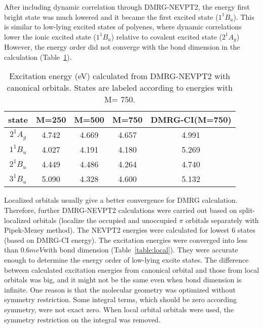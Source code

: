After including dynamic correlation through DMRG-NEVPT2, the energy first bright state was much lowered and it became the first excited state ($1^1B_u$). 
This is similar to low-lying excited states of polyenes, where dynamic correlations lower the ionic excited state ($1^1B_u$) relative to covalent excited state ($2^1A_g$)
However, the energy order did not converge with the bond dimension in the calculation (Table~\ref{table:canonical}).


\begin{table}
   \caption{Excitation energy (eV) calculated from DMRG-NEVPT2 with canonical orbitals. States are labeled according to energies with M= 750. }
  \label{table:canonical}
\begin{tabular}{ccccc}
\hline
\toprule
  state & M=250 & M=500 & M=750 & DMRG-CI(M=750)\\
 \midrule
  $2^1A_g$ & 4.742 &  4.669  &   4.657   &   4.991 \\
  $1^1B_u$ & 4.027 &  4.191  &   4.180   &   5.269 \\
  $2^1B_u$ & 4.449 &  4.486  &   4.264   &   4.740 \\
  $3^1B_u$ & 5.090 &  4.328  &   4.600   &   5.132 \\
   \bottomrule
\end{tabular}
\end{table}

Localized orbitals usually give a better convergence for DMRG calculation.\cite{olivares-amaya_ab-initio_2015} Therefore, further DMRG-NEVPT2 calculations were carried out based on split-localized orbitals (localize the occupied and unoccupied $\pi$ orbitals separately with Pipek-Mezey method\cite{pipek_fast_1989}). 
The NEVPT2 energies were calculated for lowest 6 states (based on DMRG-CI energy). The excitation energies were converged into less than $0.6 meV$with bond dimension (Table~\ref{table:local}). They were accurate enough to determine the energy order of low-lying excite states. 
The difference between calculated excitation energies from canonical orbital and those from local orbitals was big, and it might not be the same even when bond dimension is infinite. One reason is that the molecular geometry was optimized without symmetry restriction. Some integral terms, which should be zero according symmetry, were not exact zero. When local orbital orbitals were used, the symmetry restriction on the integral was removed. 

